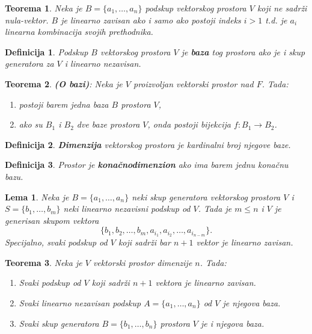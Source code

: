 \documentclass[a4paper,12pt,twoside]{report}
\newtheorem{theorem}{Teorema}[section]
\newtheorem{definition}{Definicija}[section]
\newtheorem{lemma}{Lema}[section]
\numberwithin{algorithm}{section}
\begin{document}
\begin{theorem}
    Neka je $B = \{a_1, \dots, a_n\}$ podskup vektorskog prostora $V$ koji ne sadrži nula-vektor. $B$ je linearno zavisan ako i samo ako postoji indeks $i>1$ t.d. 
    je $a_i$ linearna kombinacija svojih prethodnika.
\end{theorem}

\begin{definition}
    Podskup $B$ vektorskog prostora $V$ je \textbf{baza} tog prostora ako je i skup generatora za $V$ i linearno nezavisan.
\end{definition}


\begin{theorem}
    \textbf{(O bazi)}: Neka je $V$ proizvoljan vektorski prostor nad $F$. Tada:
    \begin{enumerate}
        \item postoji barem jedna baza $B$ prostora $V$,
        \item ako su $B_1$ i $B_2$ dve baze prostora $V$, onda postoji bijekcija $f:B_1 \to B_2$.
    \end{enumerate}
\end{theorem}

\begin{definition}
    \textbf{Dimenzija} vektorskog prostora je kardinalni broj njegove baze.
\end{definition}
\begin{definition}
    Prostor je \textbf{konačnodimenzion} ako ima barem jednu konačnu bazu.
\end{definition}

\begin{lemma}
    Neka je $B = \{a_1, \dots, a_n\}$ neki skup generatora vektorskog prostora $V$ i $S = \{b_1, \dots, b_m\}$ neki linearno nezavisni podskup od $V$. Tada 
    je $m \leq n$ i $V$ je generisan skupom vektora
    \[ \{b_1, b_2, \dots, b_m, a_{i_1}, a_{i_2}, \dots, a_{i_{n-m}}\}. \] Specijalno, svaki podskup od $V$ koji sadrži bar $n+1$ vektor je linearno zavisan.
\end{lemma}

\begin{theorem}
    Neka je $V$ vektorski prostor dimenzije $n$. Tada:
    \begin{enumerate}
        \item Svaki podskup od $V$ koji sadrži $n + 1$ vektora je linearno zavisan.
        \item Svaki linearno nezavisan podskup $A = \{a_1, \dots, a_n\}$ od $V$ je njegova baza.
        \item Svaki skup generatora $B = \{b_1, \dots, b_n\}$ prostora $V$ je i njegova baza.
    \end{enumerate}
\end{theorem}
\end{document}
